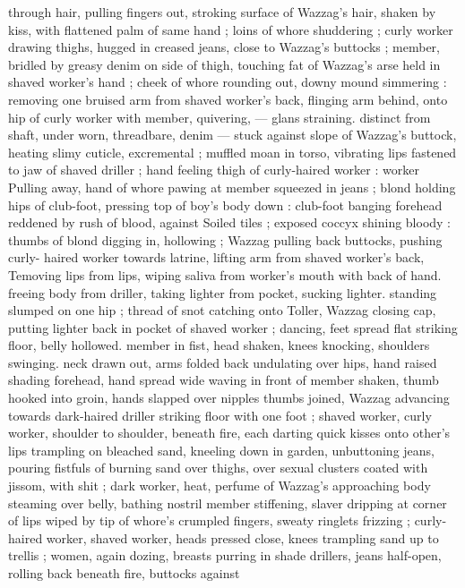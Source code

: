 through hair, pulling fingers out, stroking surface of Wazzag's hair, 
shaken by kiss, with flattened palm of same hand ; loins of whore 
shuddering ; curly worker drawing thighs, hugged in creased jeans, 
close to Wazzag's buttocks ; member, bridled by greasy denim on 
side of thigh, touching fat of Wazzag's arse held in shaved worker's 
hand ; cheek of whore rounding out, downy mound simmering : 
removing one bruised arm from shaved worker's back, flinging arm 
behind, onto hip of curly worker with member, quivering, --- glans 
straining. distinct from shaft, under worn, threadbare, denim --- 
stuck against slope of Wazzag's buttock, heating slimy cuticle, 
excremental ; muffled moan in torso, vibrating lips fastened to jaw of 
shaved driller ; hand feeling thigh of curly-haired worker : worker 
Pulling away, hand of whore pawing at member squeezed in jeans ; 
blond holding hips of club-foot, pressing top of boy's body down : 
club-foot banging forehead reddened by rush of blood, against 
Soiled tiles ; exposed coccyx shining bloody : thumbs of blond 
digging in, hollowing ; Wazzag pulling back buttocks, pushing curly- 
haired worker towards latrine, lifting arm from shaved worker's back, 
Temoving lips from lips, wiping saliva from worker's mouth with back 
of hand. freeing body from driller, taking lighter from pocket, sucking 
lighter. standing slumped on one hip ; thread of snot catching onto 
Toller, Wazzag closing cap, putting lighter back in pocket of shaved 
worker ; dancing, feet spread flat striking floor, belly hollowed. 
member in fist, head shaken, knees knocking, shoulders swinging. 
neck drawn out, arms folded back undulating over hips, hand raised 
shading forehead, hand spread wide waving in front of member 
shaken, thumb hooked into groin, hands slapped over nipples 
thumbs joined, Wazzag advancing towards dark-haired driller striking 
floor with one foot ; shaved worker, curly worker, shoulder to 
shoulder, beneath fire, each darting quick kisses onto other's lips 
trampling on bleached sand, kneeling down in garden, unbuttoning 
jeans, pouring fistfuls of burning sand over thighs, over sexual 
clusters coated with jissom, with shit ; dark worker, heat, perfume of 
Wazzag's approaching body steaming over belly, bathing nostril 
member stiffening, slaver dripping at corner of lips wiped by tip of 
whore's crumpled fingers, sweaty ringlets frizzing ; curly-haired 
worker, shaved worker, heads pressed close, knees trampling sand 
up to trellis ; women, again dozing, breasts purring in shade 
drillers, jeans half-open, rolling back beneath fire, buttocks against 

